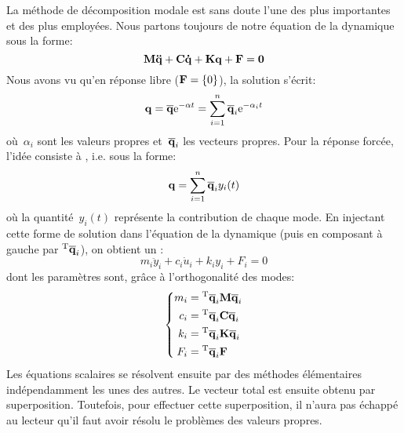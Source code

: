 La méthode de décomposition modale est sans doute l'une des plus importantes et des plus
employées.
\medskipvm
Nous partons toujours de notre équation de la dynamique sous la forme:
\begin{equation} \MM{M}\VV{\ddot{q}}+\MM{C}\VV{\dot{q}}+\MM{K}\VV{q}+\VV{F} = \VV{0} \end{equation}
\medskipvm
Nous avons vu qu'en réponse libre ($\VV{F}=\{0\}$), la solution s'écrit:
\begin{equation} \VV{q} = \VV{\overline{q}} \mathrm{e}^{-\alpha t} = \dsum_{i=1}^n \VV{\overline{q}}_i \mathrm{e}^{-\alpha_i t} \end{equation}
où~$\alpha_i$ sont les valeurs propres et~$\VV{\overline{q}}_i$ les vecteurs propres.
\medskipvm
Pour la réponse forcée, l'idée consiste à , i.e. sous la forme:
\begin{equation} \VV{q} = \dsum_{i=1}^n \VV{\overline{q}}_i y_i(t) \end{equation}
où la quantité~$y_i(t)$ représente la contribution de chaque mode.
\medskipvm
En injectant cette forme de solution dans l'équation de la dynamique (puis en composant à gauche par ${}^\mathrm{T}\mathbf{\overline{q}}_i$), on obtient un :
\begin{equation} m_i\ddot{y}_i+c_i\dot{u}_i+k_iy_i+F_i = 0 \end{equation}
dont les paramètres sont, grâce à l'orthogonalité des modes:
\begin{equation}\left\{
\begin{aligned}
	m_i &= \LL{\overline{q}}_i\MM{M}\VV{\overline{q}}_i\\
	c_i &= \LL{\overline{q}}_i\MM{C}\VV{\overline{q}}_i\\
	k_i &= \LL{\overline{q}}_i\MM{K}\VV{\overline{q}}_i\\
	F_i &= \LL{\overline{q}}_i\VV{F}
\end{aligned}
\right.\end{equation}
Les équations scalaires se résolvent ensuite par des méthodes élémentaires indépendamment les unes des autres. Le vecteur total est ensuite obtenu par superposition.
\medskipvm
Toutefois, pour effectuer cette superposition, il n'aura pas échappé au lecteur qu'il faut avoir résolu le problèmes des valeurs propres.
